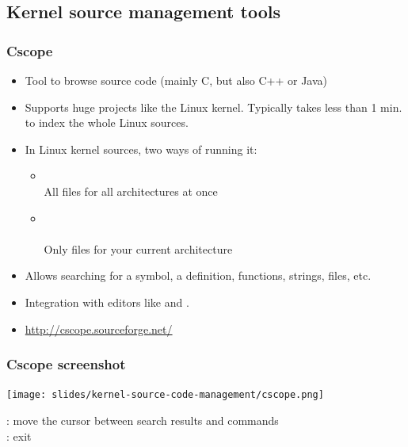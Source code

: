 \subsection{Kernel source management tools}

\begin{frame}
  \frametitle{Cscope}
  \begin{itemize}
  \item Tool to browse source code (mainly C, but also C++ or Java)
  \item Supports huge projects like the Linux kernel. Typically takes less
    than 1 min. to index the whole Linux sources.
  \item In Linux kernel sources, two ways of running it:
    \begin{itemize}
    \item {}\\
      All files for all architectures at once
    \item {}\\
      \\
      Only files for your current architecture
    \end{itemize}
  \item Allows searching for a symbol, a definition, functions,
    strings, files, etc.
  \item Integration with editors like  and .
  \item \url{http://cscope.sourceforge.net/}
  \end{itemize}
\end{frame}

\begin{frame}
  \frametitle{Cscope screenshot}
  \begin{center}
    \texttt{[image: slides/kernel-source-code-management/cscope.png]}
  \end{center}
  \code{[Tab]}: move the cursor between search results and commands\\
  \code{[Ctrl] [D]}: exit 
\end{frame}

